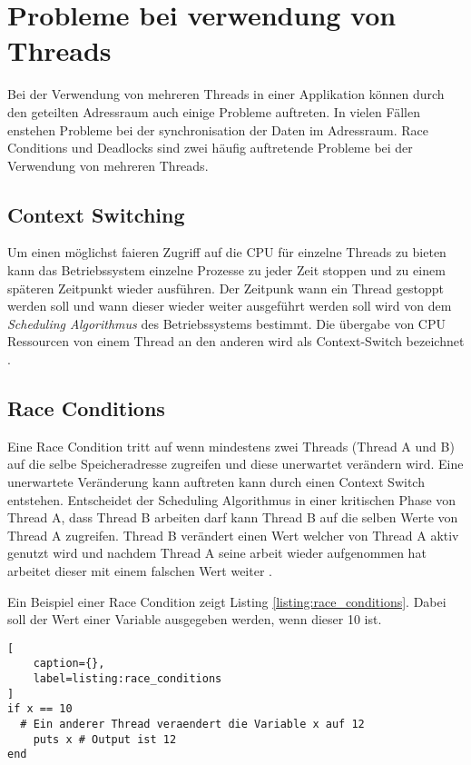 \section{Probleme bei verwendung von Threads}
Bei der Verwendung von mehreren Threads in einer Applikation können durch den geteilten Adressraum auch einige Probleme auftreten. In vielen Fällen enstehen Probleme bei der synchronisation der Daten im Adressraum. Race Conditions und Deadlocks sind zwei häufig auftretende Probleme bei der Verwendung von mehreren Threads. 

\subsection{Context Switching}
Um einen möglichst faieren Zugriff auf die CPU für einzelne Threads zu bieten kann das Betriebssystem einzelne Prozesse zu jeder Zeit stoppen und zu einem späteren Zeitpunkt wieder ausführen. Der Zeitpunk wann ein Thread gestoppt werden soll und wann dieser wieder weiter ausgeführt werden soll wird von dem \emph{Scheduling Algorithmus} des Betriebssystems bestimmt. Die übergabe von CPU Ressourcen von einem Thread an den anderen wird als Context-Switch bezeichnet \cite[p. 23]{Sto2013}.

\subsection{Race Conditions}

Eine Race Condition tritt auf wenn mindestens zwei Threads (Thread A und B) auf die selbe Speicheradresse zugreifen und diese unerwartet verändern wird. Eine unerwartete Veränderung kann auftreten kann durch einen Context Switch entstehen. Entscheidet der Scheduling Algorithmus in einer kritischen Phase von Thread A, dass Thread B arbeiten darf kann Thread B auf die selben Werte von Thread A zugreifen. Thread B verändert einen Wert welcher von Thread A aktiv genutzt wird und nachdem Thread A seine arbeit wieder aufgenommen hat arbeitet dieser mit einem falschen Wert weiter \cite[p. 89]{tan09}. 

Ein Beispiel einer Race Condition zeigt Listing \ref{listing:race_conditions}. Dabei soll der Wert einer Variable ausgegeben werden, wenn dieser 10 ist.

\begin{lstlisting}[
	caption={},
	label=listing:race_conditions
]
if x == 10
  # Ein anderer Thread veraendert die Variable x auf 12
	puts x # Output ist 12 
end
\end{lstlisting}

